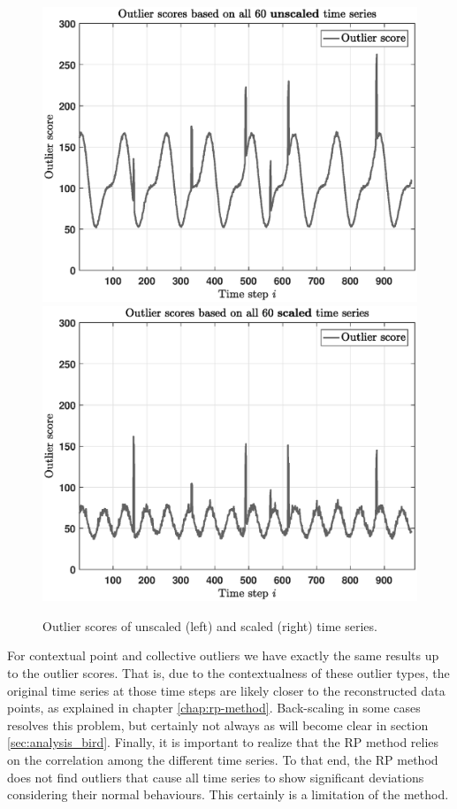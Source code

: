 \begin{figure}[h]
	\centering
	\includegraphics[scale=0.36]{analysis/Analysis_unscaled_outlierscores}
	\includegraphics[scale=0.36]{analysis/Analysis_scaled_outlierscores}
	\caption{Outlier scores of unscaled (left) and scaled (right) time series.}
	\label{fig:analysis_innerworking_outlierscores}
\end{figure}

For contextual point and collective outliers we have exactly the same results up to the outlier scores. That is, due to the contextualness of these outlier types, the original time series at those time steps are likely closer to the reconstructed data points, as explained in chapter \ref{chap:rp-method}. Back-scaling in some cases resolves this problem, but certainly not always as will become clear in section \ref{sec:analysis_bird}.
Finally, it is important to realize that the RP method relies on the correlation among the different time series. To that end, the RP method does not find outliers that cause all time series to show significant deviations considering their normal behaviours. This certainly is a limitation of the method.


